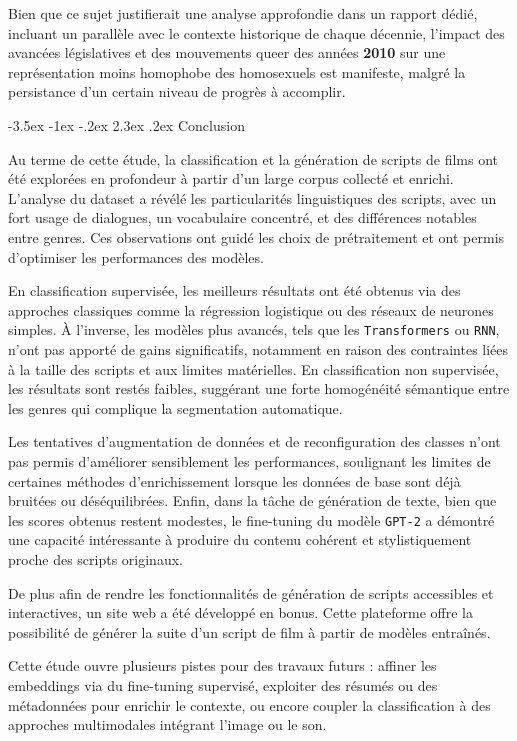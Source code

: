 \documentclass[12pt]{report}
\makeatletter
\renewcommand{\chapter}{\@startsection{chapter}{0}{\z@}
  {-3.5ex \@plus -1ex \@minus -.2ex}
  {2.3ex \@plus.2ex}
  {\normalfont\LARGE\bfseries}}
\makeatother
\begin{document}
Bien que ce sujet justifierait une analyse approfondie dans un rapport dédié, incluant un parallèle avec le contexte historique de chaque décennie, l'impact des avancées législatives et des mouvements queer des années \textbf{2010} sur une représentation moins homophobe des homosexuels est manifeste, malgré la persistance d'un certain niveau de progrès à accomplir. 

\chapter{Conclusion}

Au terme de cette étude, la classification et la génération de scripts de films ont été explorées en profondeur à partir d’un large corpus collecté et enrichi. L’analyse du dataset a révélé les particularités linguistiques des scripts, avec un fort usage de dialogues, un vocabulaire concentré, et des différences notables entre genres. Ces observations ont guidé les choix de prétraitement et ont permis d’optimiser les performances des modèles.

En classification supervisée, les meilleurs résultats ont été obtenus via des approches classiques comme la régression logistique ou des réseaux de neurones simples. À l’inverse, les modèles plus avancés, tels que les \texttt{Transformers} ou \texttt{RNN}, n’ont pas apporté de gains significatifs, notamment en raison des contraintes liées à la taille des scripts et aux limites matérielles. En classification non supervisée, les résultats sont restés faibles, suggérant une forte homogénéité sémantique entre les genres qui complique la segmentation automatique.

Les tentatives d’augmentation de données et de reconfiguration des classes n’ont pas permis d'améliorer sensiblement les performances, soulignant les limites de certaines méthodes d’enrichissement lorsque les données de base sont déjà bruitées ou déséquilibrées. Enfin, dans la tâche de génération de texte, bien que les scores obtenus restent modestes, le fine-tuning du modèle \texttt{GPT-2} a démontré une capacité intéressante à produire du contenu cohérent et stylistiquement proche des scripts originaux.

De plus afin de rendre les fonctionnalités de génération de scripts accessibles et interactives, un site web a été développé en bonus. Cette plateforme offre la possibilité de générer la suite d'un script de film à partir de modèles entraînés.

Cette étude ouvre plusieurs pistes pour des travaux futurs : affiner les embeddings via du fine-tuning supervisé, exploiter des résumés ou des métadonnées pour enrichir le contexte, ou encore coupler la classification à des approches multimodales intégrant l’image ou le son.
\end{document}
